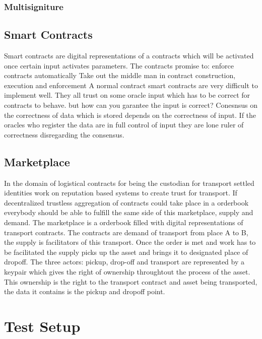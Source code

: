 \documentclass[Nomencl]{DylanMaster}
\begin{document}
\subsubsection{Multisigniture}



\subsection{Smart Contracts}

Smart contracts are digital representations of a contracts which will be activated once certain input activates parameters. The contracts promise to:
 enforce contracts automatically
Take out the middle man in contract construction, execution and enforcement
A normal contract
smart contracts are very difficult to implement well. They all trust on some oracle input which has to be correct for contracts to behave.  but how can you garantee the input is correct? Conesnsus on the correctness of data which is stored depends on the correctness of input. If the oracles who register the data are in full control of input they are lone ruler of correctness disregarding the consensus.

\subsection{Marketplace}

In the domain of logistical contracts for being the custodian for transport settled identities work on reputation based systems to create trust for transport. If decentralized trustless aggregation of contracts could take place in a orderbook everybody should be able to fulfill the same side of this marketplace, supply and demand.
The marketplace is a orderbook filled with digital representations of transport contracts. The contracts are demand of transport from place A to B, the supply is facilitators of this transport. Once the order is met and work has to be facilitated the supply picks up the asset and brings it to designated place of dropoff. The three actors: pickup, drop-off and transport are represented by a keypair which gives the right of ownership throughtout the process of the asset. This ownership is the right to the transport contract and asset being transported, the data it contains is the pickup and dropoff point.

\section{Test Setup}
\end{document}
